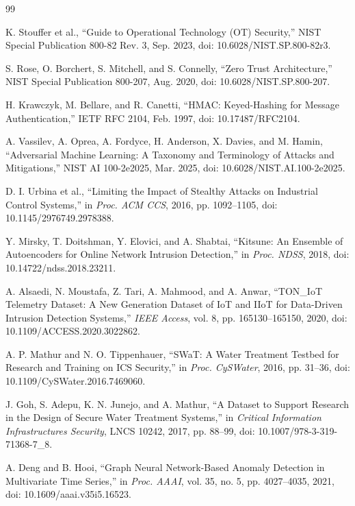 \documentclass[journal]{IEEEtran}
\begin{document}
\begingroup
\scriptsize
\setlength{\itemsep}{-1.2pt}
\setlength{\parsep}{0pt}
\begin{thebibliography}{99}

K. Stouffer et al., ``Guide to Operational Technology (OT) Security,'' NIST Special Publication 800-82 Rev. 3, Sep. 2023, doi: 10.6028/NIST.SP.800-82r3.

S. Rose, O. Borchert, S. Mitchell, and S. Connelly, ``Zero Trust Architecture,'' NIST Special Publication 800-207, Aug. 2020, doi: 10.6028/NIST.SP.800-207.

H. Krawczyk, M. Bellare, and R. Canetti, ``HMAC: Keyed-Hashing for Message Authentication,'' IETF RFC 2104, Feb. 1997, doi: 10.17487/RFC2104.

A. Vassilev, A. Oprea, A. Fordyce, H. Anderson, X. Davies, and M. Hamin, ``Adversarial Machine Learning: A Taxonomy and Terminology of Attacks and Mitigations,'' NIST AI 100-2e2025, Mar. 2025, doi: 10.6028/NIST.AI.100-2e2025.

D. I. Urbina et al., ``Limiting the Impact of Stealthy Attacks on Industrial Control Systems,'' in \emph{Proc. ACM CCS}, 2016, pp. 1092--1105, doi: 10.1145/2976749.2978388.

Y. Mirsky, T. Doitshman, Y. Elovici, and A. Shabtai, ``Kitsune: An Ensemble of Autoencoders for Online Network Intrusion Detection,'' in \emph{Proc. NDSS}, 2018, doi: 10.14722/ndss.2018.23211.

A. Alsaedi, N. Moustafa, Z. Tari, A. Mahmood, and A. Anwar, ``TON\_IoT Telemetry Dataset: A New Generation Dataset of IoT and IIoT for Data-Driven Intrusion Detection Systems,'' \emph{IEEE Access}, vol. 8, pp. 165130--165150, 2020, doi: 10.1109/ACCESS.2020.3022862.

A. P. Mathur and N. O. Tippenhauer, ``SWaT: A Water Treatment Testbed for Research and Training on ICS Security,'' in \emph{Proc. CySWater}, 2016, pp. 31--36, doi: 10.1109/CySWater.2016.7469060.

J. Goh, S. Adepu, K. N. Junejo, and A. Mathur, ``A Dataset to Support Research in the Design of Secure Water Treatment Systems,'' in \emph{Critical Information Infrastructures Security}, LNCS 10242, 2017, pp. 88--99, doi: 10.1007/978-3-319-71368-7\_8.

A. Deng and B. Hooi, ``Graph Neural Network-Based Anomaly Detection in Multivariate Time Series,'' in \emph{Proc. AAAI}, vol. 35, no. 5, pp. 4027--4035, 2021, doi: 10.1609/aaai.v35i5.16523.


\end{thebibliography}
\end{document}
